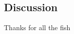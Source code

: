 \documentclass{pnastwo}
\begin{document}
\begin{article}



\section{Discussion}



\begin{acknowledgments}
Thanks for all the fish
\end{acknowledgments}








\end{article}
\end{document}
